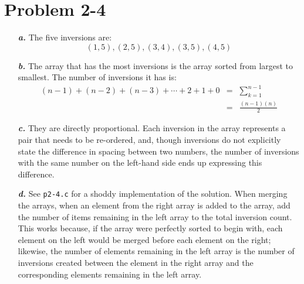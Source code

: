 \documentclass{article}
\begin{document}
\section*{Problem 2-4}

\noindent\begin{enumerate}
	\item[\textbf{\textit{a.}}]
		The five inversions are:
		\begin{equation*}
			(1,5), (2,5), (3,4), (3,5), (4,5)
		\end{equation*}

	\item[\textbf{\textit{b.}}]
		The array that has the most inversions is the array sorted from largest to smallest. The number of inversions it has is:
		\begin{eqnarray*}
			(n-1) + (n-2) + (n-3) + \cdots + 2 + 1 + 0 & = & \sum_{k=1}^{n-1} \\
			& = & \frac{(n-1)(n)}{2}
		\end{eqnarray*}

	\item[\textbf{\textit{c.}}]
		They are directly proportional. Each inversion in the array represents a pair that needs to be re-ordered, and, though inversions do not explicitly state the difference in spacing between two numbers, the number of inversions with the same number on the left-hand side ends up expressing this difference.

	\item[\textbf{\textit{d.}}] 
		See \texttt{p2-4.c} for a shoddy implementation of the solution. When merging the arrays, when an element from the right array is added to the array, add the number of items remaining in the left array to the total inversion count. This works because, if the array were perfectly sorted to begin with, each element on the left would be merged before each element on the right; likewise, the number of elements remaining in the left array is the number of inversions created between the element in the right array and the corresponding elements remaining in the left array.
\end{enumerate}
\end{document}
